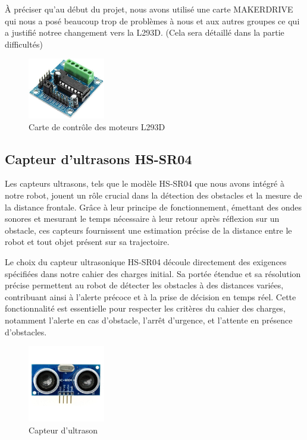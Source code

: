 À préciser qu'au début du projet, nous avons utilisé une carte MAKERDRIVE qui nous a posé beaucoup trop de problèmes à nous et aux autres groupes ce qui a justifié notree changement vers la L293D. (Cela sera détaillé dans la partie difficultés)

\begin{figure}[h]
    \centering
    \includegraphics[width=0.3\textwidth]{images/L293D.jpg}
    \caption{Carte de contrôle des moteurs L293D}
    \label{fig:L293D}
\end{figure}

\subsection{Capteur d'ultrasons HS-SR04}
Les capteurs ultrasons, tels que le modèle HS-SR04 que nous avons intégré à notre robot, jouent un rôle crucial dans la détection des obstacles et la mesure de la distance frontale. Grâce à leur principe de fonctionnement, émettant des ondes sonores et mesurant le temps nécessaire à leur retour après réflexion sur un obstacle, ces capteurs fournissent une estimation précise de la distance entre le robot et tout objet présent sur sa trajectoire.

Le choix du capteur ultrasonique HS-SR04 découle directement des exigences spécifiées dans notre cahier des charges initial. Sa portée étendue et sa résolution précise permettent au robot de détecter les obstacles à des distances variées, contribuant ainsi à l'alerte précoce et à la prise de décision en temps réel. Cette fonctionnalité est essentielle pour respecter les critères du cahier des charges, notamment l'alerte en cas d'obstacle, l'arrêt d'urgence, et l'attente en présence d'obstacles.

\begin{figure}[h]
    \centering
    \includegraphics[width=0.3\textwidth]{images/capteur_ultrason.jpg}
    \caption{Capteur d'ultrason}
    \label{fig:HS-SR04}
\end{figure}

